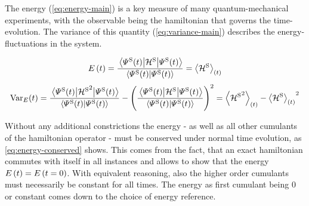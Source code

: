 The energy \energyOft (\autoref{eq:energy-main}) is a key measure of many quantum-mechanical experiments, with the observable being the hamiltonian that governs the time-evolution.
The variance \varianceOft of this quantity (\autoref{eq:variance-main}) describes the energy-fluctuations in the system.

\begin{equation}
    \label{eq:energy-main}
    \energyOft = \frac{\bracketHelper{\psiOfT[\schroedingerPicture]}{\pictureHamiltonian[\schroedingerPicture]}{\psiOfT[\schroedingerPicture]}}{\braketHelper{\psiOfT[\schroedingerPicture]}{\psiOfT[\schroedingerPicture]}}
       = \timeExpectationVal{\pictureHamiltonian[\schroedingerPicture]}
\end{equation}
\begin{equation}
    \label{eq:variance-main}
    \varianceOft = \frac{\bracketHelper{\psiOfT[\schroedingerPicture]}{{\pictureHamiltonian[\schroedingerPicture]}^2}{\psiOfT[\schroedingerPicture]}}{\braketHelper{\psiOfT[\schroedingerPicture]}{\psiOfT[\schroedingerPicture]}}-\left(\frac{\bracketHelper{\psiOfT[\schroedingerPicture]}{\pictureHamiltonian[\schroedingerPicture]}{\psiOfT[\schroedingerPicture]}}{\braketHelper{\psiOfT[\schroedingerPicture]}{\psiOfT[\schroedingerPicture]}}\right)^2
       = \timeExpectationVal{{\pictureHamiltonian[\schroedingerPicture]}^2} - {\timeExpectationVal{\pictureHamiltonian[\schroedingerPicture]}}^2
\end{equation}

Without any additional constrictions %
the energy - as well as all other cumulants of the hamiltonian operator - must be conserved under normal time evolution, as \autoref{eq:energy-conserved} shows. 
This comes from the fact, that an exact hamiltonian commutes with itself in all instances and allows to show that the energy $\energyOft = \energyOft[t=0]$.
With equivalent reasoning, also the higher order cumulants must necessarily be constant for all times.
The energy as first cumulant %
being 0 or constant comes down to the choice of energy reference.

